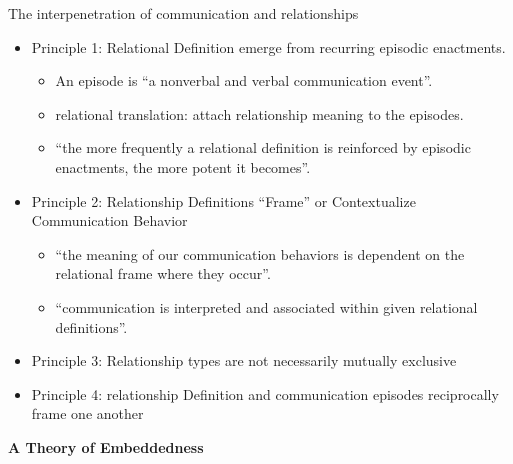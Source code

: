 \documentclass[
]{book}
\providecommand{\tightlist}{%
  \setlength{\itemsep}{0pt}\setlength{\parskip}{0pt}}
\begin{document}
The interpenetration of communication and relationships

\begin{itemize}
\item
  Principle 1: Relational Definition emerge from recurring episodic
  enactments.

  \begin{itemize}
  \tightlist
  \item
    An episode is ``a nonverbal and verbal communication event''.
  \item
    relational translation: attach relationship meaning to the
    episodes.
  \item
    ``the more frequently a relational definition is reinforced by
    episodic enactments, the more potent it becomes''.
  \end{itemize}
\item
  Principle 2: Relationship Definitions ``Frame'' or Contextualize
  Communication Behavior

  \begin{itemize}
  \tightlist
  \item
    ``the meaning of our communication behaviors is dependent on the
    relational frame where they occur''.\\
  \item
    ``communication is interpreted and associated within given
    relational definitions''.
  \end{itemize}
\item
  Principle 3: Relationship types are not necessarily mutually
  exclusive
\item
  Principle 4: relationship Definition and communication episodes
  reciprocally frame one another
\end{itemize}

\textbf{A Theory of Embeddedness}
\end{document}
